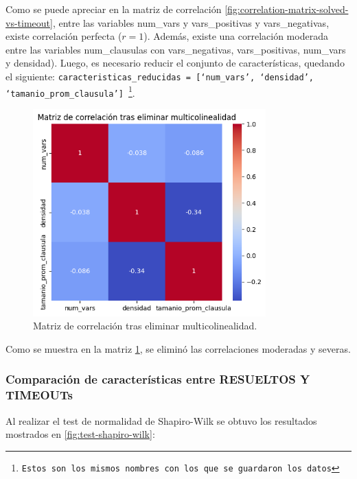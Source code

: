 Como se puede apreciar en la matriz de correlaci\'on \ref{fig:correlation-matrix-solved-vs-timeout}, entre las variables num\_vars y vars\_positivas y vars\_negativas, existe correlaci\'on perfecta ($r=1$). Adem\'as, existe una correlaci\'on moderada entre las variables num\_clausulas con vars\_negativas, vars\_positivas, num\_vars y densidad). Luego, es necesario reducir el conjunto de caracter\'isticas, quedando  el siguiente: \texttt{caracteristicas\_reducidas = [`num\_vars', `densidad', `tamanio\_prom\_clausula'] \footnote{Estos son los mismos nombres con los que se guardaron los datos}}.

\begin{figure}[ht]
    \centering
    \includegraphics[width=0.8\textwidth]{Graphics/correlation_matrix_after_delete_multicol.png}
    \caption{Matriz de correlaci\'on tras eliminar multicolinealidad.}
    \label{fig:correlation-matrix-after-delete-multicol}
\end{figure}

Como se muestra en la matriz \ref{fig:correlation-matrix-after-delete-multicol}, se elimin\'o las correlaciones moderadas y severas.

\subsubsection{Comparaci\'on de caracter\'isticas entre RESUELTOS Y TIMEOUTs}

Al realizar el test de normalidad de Shapiro-Wilk se obtuvo los resultados mostrados en \ref{fig:test-shapiro-wilk}:


